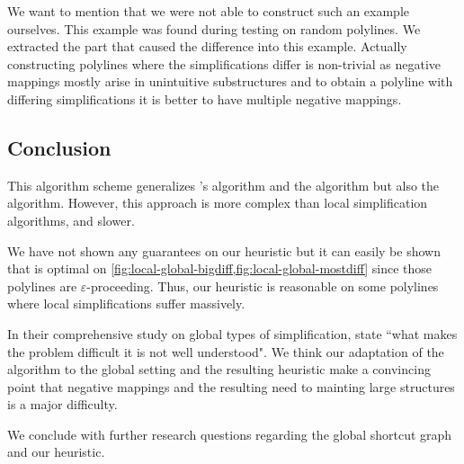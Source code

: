 We want to mention that we were not able to construct such an example ourselves. This example was found during testing on random polylines. We extracted the part that caused the difference into this example. Actually constructing polylines where the simplifications differ is non-trivial as negative mappings mostly arise in unintuitive substructures and to obtain a polyline with differing simplifications it is better to have multiple negative mappings.

\subsection{Conclusion}

This algorithm scheme generalizes \citeauthor{global_curve_simplification}'s algorithm and the \citeauthor{on_optimal_polyline_simplification_using_the_hausdorff_and_frechet_distance} algorithm but also the \citeauthor{computational_geometric_methods_for_polygonal_approximations_of_a_curve} algorithm. However, this approach is more complex than local simplification algorithms, and slower.

We have not shown any guarantees on our heuristic but it can easily be shown that is optimal on \cref{fig:local-global-bigdiff,fig:local-global-mostdiff} since those polylines are \(\varepsilon\)-proceeding. Thus, our heuristic is reasonable on some polylines where local simplifications suffer massively.

In their comprehensive study on global types of simplification, \citeauthor{global_curve_simplification} state ``what makes the problem difficult it is not well understood". We think our adaptation of the \citeauthor{computational_geometric_methods_for_polygonal_approximations_of_a_curve} algorithm to the global setting and the resulting heuristic make a convincing point that negative mappings and the resulting need to mainting large structures is a major difficulty.

We conclude with further research questions regarding the global shortcut graph and our heuristic.

